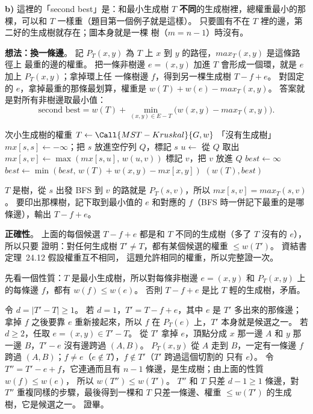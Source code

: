 \begin{pastsoln}
\textbf{b)} 這裡的「second best」是：和最小生成樹 $T$ \textbf{不同}的生成樹裡，總權重最小的那棵，可以和
$T$ 一樣重（題目第一個例子就是這樣）。 只要圖有不在 $T$ 裡的邊，第二好的生成樹就存在；圖本身就是一棵
樹（$m = n - 1$）時沒有。

\textbf{想法：換一條邊}。 記 $P_T(x, y)$ 為 $T$ 上 $x$ 到 $y$ 的路徑，$\mathit{max}_T(x, y)$ 是這條路徑上
最重的邊的權重。 把一條非樹邊 $e = (x, y)$ 加進 $T$ 會形成一個環，就是 $e$ 加上 $P_T(x, y)$；拿掉環上任
一條樹邊 $f$，得到另一棵生成樹 $T - f + e$。 對固定的 $e$，拿掉最重的那條最划算，權重是
$w(T) + w(e) - \mathit{max}_T(x, y)$。 答案就是對所有非樹邊取最小值：
\[
\text{second best} = w(T) + \min_{(x, y) \in E - T} \bigl( w(x, y) - \mathit{max}_T(x, y) \bigr).
\]

\begin{pseudo}{次小生成樹的權重}
    \State $T \gets \Call{MST-Kruskal}{G, w}$
        \State \Return 「沒有生成樹」
    \EndIf
     
        \State $\mathit{mx}[s, s] \gets -\infty$；把 $s$ 放進空佇列 $Q$，標記 $s$
            \State $u \gets$ 從 $Q$ 取出
                \State $\mathit{mx}[s, v] \gets \max(\mathit{mx}[s, u],\, w(u, v))$
                \State 標記 $v$，把 $v$ 放進 $Q$
            \EndFor
        \EndWhile
    \EndFor
    \State $\mathit{best} \gets \infty$
        \State $\mathit{best} \gets \min(\mathit{best},\, w(T) + w(x, y) - \mathit{mx}[x, y])$
    \EndFor
    \State \Return $(w(T), \mathit{best})$ 
\EndFunction
\end{pseudo}
$T$ 是樹，從 $s$ 出發 BFS 到 $v$ 的路就是 $P_T(s, v)$，所以 $\mathit{mx}[s, v] = \mathit{max}_T(s, v)$。
要印出那棵樹，記下取到最小值的 $e$ 和對應的 $f$（BFS 時一併記下最重的是哪條邊），輸出 $T - f + e$。

\textbf{正確性}。 上面的每個候選 $T - f + e$ 都是和 $T$ 不同的生成樹（多了 $T$ 沒有的 $e$），所以只要
證明：對任何生成樹 $T' \ne T$，都有某個候選的權重 $\le w(T')$。 資結書定理~24.12 假設權重互不相同，
這題允許相同的權重，所以完整證一次。

先看一個性質：$T$ 是最小生成樹，所以對每條非樹邊 $e = (x, y)$ 和 $P_T(x, y)$ 上的每條邊 $f$，都有
$w(f) \le w(e)$。 否則 $T - f + e$ 是比 $T$ 輕的生成樹，矛盾。

令 $d = |T' - T| \ge 1$。 若 $d = 1$，$T' = T - f + e$，其中 $e$ 是 $T'$ 多出來的那條邊；拿掉 $f$ 之後要靠
$e$ 重新接起來，所以 $f$ 在 $P_T(e)$ 上，$T'$ 本身就是候選之一。 若 $d \ge 2$，任取 $e = (x, y) \in T' - T$。
從 $T'$ 拿掉 $e$，頂點分成 $x$ 那一邊 $A$ 和 $y$ 那一邊 $B$，$T' - e$ 沒有邊跨過 $(A, B)$。 $P_T(x, y)$ 從
$A$ 走到 $B$，一定有一條邊 $f$ 跨過 $(A, B)$；$f \ne e$（$e \notin T$），$f \notin T'$（$T'$ 跨過這個切割的
只有 $e$）。 令 $T'' = T' - e + f$，它連通而且有 $n - 1$ 條邊，是生成樹；由上面的性質 $w(f) \le w(e)$，
所以 $w(T'') \le w(T')$。 $T''$ 和 $T$ 只差 $d - 1 \ge 1$ 條邊，對 $T''$ 重複同樣的步驟，最後得到一棵和
$T$ 只差一條邊、權重 $\le w(T')$ 的生成樹，它是候選之一。 證畢。


\end{pastsoln}
